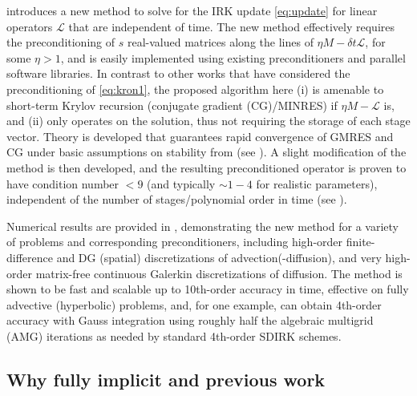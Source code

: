 \documentclass[review]{siamart}
\begin{document}
 introduces a new method to solve for the IRK update
\eqref{eq:update} for linear operators $\mathcal{L}$ that are independent of time.
The new method effectively
requires the preconditioning of $s$ real-valued matrices along the lines of
$\eta M - \delta t\mathcal{L}$, for some $\eta > 1$, and is easily implemented
using existing preconditioners and parallel software libraries.
In contrast to other works that have considered the preconditioning of \eqref{eq:kron1},
the proposed algorithm here (i) is amenable to short-term Krylov recursion (conjugate
gradient (CG)/MINRES) if $\eta M - \mathcal{L}$ is, and (ii) only operates on the solution,
thus not requiring the storage of each stage vector. Theory is developed
that guarantees rapid convergence of GMRES and CG under basic assumptions
on stability from  (see ). A slight
modification of the method is then developed, and the resulting preconditioned
operator is proven to have condition number $<9$ (and typically $\sim1-4$ for
realistic parameters), independent of the number of
stages/polynomial order in time (see ).

Numerical results are provided in , demonstrating the new
method for a variety of problems and corresponding preconditioners, including
high-order finite-difference and DG (spatial) discretizations of
advection(-diffusion), and very high-order matrix-free continuous Galerkin
discretizations of diffusion. The method is shown to be fast and scalable
up to 10th-order accuracy in time, effective on fully advective (hyperbolic)
problems, and, for one example, can obtain 4th-order accuracy with Gauss
integration using roughly half the algebraic multigrid (AMG) iterations
as needed by standard 4th-order SDIRK schemes.

\subsection{Why fully implicit and previous work}\label{sec:intro:hist}
\end{document}
